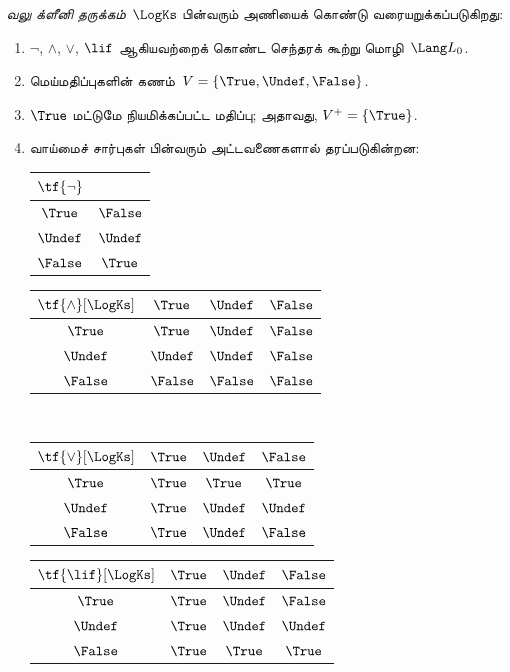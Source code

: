 \documentclass[../../../include/open-logic-section]{subfiles}
\begin{document}
\begin{defn}
\emph{வலு க்ளீனி தருக்கம்}~$\LogKs$ பின்வரும் அணியைக் கொண்டு
வரையறுக்கப்படுகிறது:
\begin{enumerate}
  \item $\lnot$, $\land$, $\lor$, $\lif$ ஆகியவற்றைக் கொண்ட செந்தரக்
  கூற்று மொழி~$\Lang L_0$.
  \item மெய்மதிப்புகளின் கணம்~$V = \{\True, \Undef, \False\}$.
  \item $\True$ மட்டுமே நியமிக்கப்பட்ட மதிப்பு; அதாவது,
  $V^+ = \{\True\}$.
  \item வாய்மைச் சார்புகள் பின்வரும் அட்டவணைகளால் தரப்படுகின்றன:
  \begin{center}
    \begin{tabular}{c|c}
      $\tf{\lnot}$ & \\
      \hline
      $\True$ & $\False$ \\
      $\Undef$ & $\Undef$ \\
      $\False$ & $\True$
    \end{tabular}
    \quad
    \begin{tabular}{c|ccc}
      $\tf{\land}[\LogKs]$ & $\True$ & $\Undef$ & $\False$ \\
      \hline
      $\True$ & $\True$ & $\Undef$ & $\False$ \\
      $\Undef$ & $\Undef$ & $\Undef$ & $\False$\\
      $\False$ & $\False$ & $\False$ & $\False$
    \end{tabular}
    \\[2ex]
    \begin{tabular}{c|ccc}
      $\tf{\lor}[\LogKs]$ & $\True$ & $\Undef$ & $\False$ \\
      \hline
      $\True$ & $\True$ & $\True$ & $\True$ \\
      $\Undef$ & $\True$ & $\Undef$ & $\Undef$ \\
      $\False$ & $\True$ & $\Undef$ & $\False$
    \end{tabular}
    \quad
    \begin{tabular}{c|ccc}
      $\tf{\lif}[\LogKs]$ & $\True$ & $\Undef$ & $\False$ \\
      \hline
      $\True$ & $\True$ & $\Undef$ & $\False$ \\
      $\Undef$ & $\True$ & $\Undef$ & $\Undef$  \\
      $\False$ & $\True$ & $\True$ & $\True$
    \end{tabular}
  \end{center}
\end{enumerate}
\end{defn}
\end{document}
